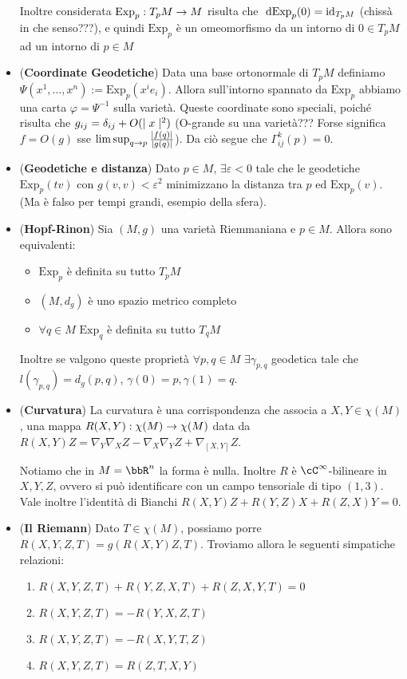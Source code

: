 \documentclass[a4paper,NoNotes,GeneralMath]{stdmdoc}
\newcommand{\Exp}{\ensuremath{\text{Exp}}}
\begin{document}
\begin{itemize}
  Inoltre considerata $\Exp_p: T_pM \rar M$ risulta che $\de \Exp_p (0) = \Id_{T_p M}$ (chissà in che senso???), e quindi $\Exp_p$ è un omeomorfismo da un intorno di $0 \in T_pM$ ad un intorno di $p \in M$
\item ({\bf Coordinate Geodetiche}) Data una base ortonormale di $T_pM$ definiamo $\Psi(x^1, \ldots, x^n) := \Exp_p (x^i e_i)$. Allora sull'intorno spannato da $\Exp_p$ abbiamo una carta $\varphi = \Psi^{-1}$ sulla varietà. Queste coordinate sono speciali, poiché risulta che $g_{ij} = \delta_{ij} + O(\mid x \mid^2)$ (O-grande su una varietà??? Forse significa $f = O(g)$ sse $\limsup_{q \rightarrow p} \frac{\mid f(q) \mid}{\mid g(q) \mid}$). Da ciò segue che $\Gamma_{ij}^k (p) = 0$.
\item ({\bf Geodetiche e distanza}) Dato $p \in M$, $\exists \varepsilon < 0$ tale che le geodetiche $\Exp_p (tv)$ con $g(v, v) < \varepsilon^2$ minimizzano la distanza tra $p$ ed $\Exp_p(v)$. (Ma è falso per tempi grandi, esempio della sfera).
\item ({\bf Hopf-Rinon}) Sia $(M, g)$ una varietà Riemmaniana e $p \in M$. Allora sono equivalenti:
  \begin{itemize}
  \item $\Exp_p$ è definita su tutto $T_pM$
  \item $(M, d_g)$ è uno spazio metrico completo
  \item $\forall q \in M$ $\Exp_q$ è definita su tutto $T_qM$
  \end{itemize}
  Inoltre se valgono queste proprietà $\forall p, q \in M$ $\exists \gamma_{p, q}$ geodetica tale che $l(\gamma_{p,q}) = d_g(p, q)$, $\gamma(0) = p, \gamma(1) = q$.
\item ({\bf Curvatura}) La curvatura è una corrispondenza che associa a $X, Y \in \chi(M)$, una mappa $R(X, Y): \chi(M) \rightarrow \chi(M)$ data da $R(X, Y) Z = \nabla_Y \nabla_X Z - \nabla_X \nabla_Y Z + \nabla_{[X, Y]} Z$.

  Notiamo che in $M = \bbR^n$ la forma è nulla. Inoltre $R$ è $\cC^\infty$-bilineare in $X, Y, Z$, ovvero si può identificare con un campo tensoriale di tipo $(1, 3)$. Vale inoltre l'identità di Bianchi $R(X, Y) Z + R(Y, Z) X + R(Z, X) Y = 0$.
\item ({\bf Il Riemann}) Dato $T \in \chi(M)$, possiamo porre $R(X, Y, Z, T) = g(R(X, Y) Z, T)$. Troviamo allora le seguenti simpatiche relazioni:
  \begin{enumerate}
  \item $R(X, Y, Z, T) + R(Y, Z, X, T) + R(Z, X, Y, T) = 0$
  \item $R(X, Y, Z, T) = - R(Y, X, Z, T)$
  \item $R(X, Y, Z, T) = - R(X, Y, T, Z)$
  \item $R(X, Y, Z, T) = R(Z, T, X, Y)$
  \end{enumerate}


\end{itemize}
\end{document}
